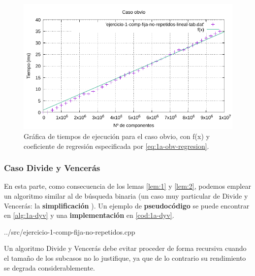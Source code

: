 \begin{figure}[h]
	\centering
	\includegraphics[scale=0.76]{img/e1a-obv}
	\caption{Gráfica de tiempos de ejecución para el caso obvio, 
		con f(x) y coeficiente de regresión especificada por \ref{eq:1a-obv-regresion}.}
	\label{fig:1a-obv-graph}
\end{figure}

\newpage

\subsubsection{Caso Divide y Vencerás} \label{sec:1a-dyv}

En esta parte, como consecuencia de los lemas \ref{lem:1} y \ref{lem:2}, podemos emplear un 
algoritmo similar al de búsqueda binaria (un caso muy particular de Divide y Vencerás: la
\textbf{simplificación} \cite{Verdegay2017}). Un ejemplo de \textbf{pseudocódigo} se puede encontrar en \ref{alg:1a-dyv} y
una \textbf{implementación} en \ref{cod:1a-dyv}.






{../src/ejercicio-1-comp-fija-no-repetidos.cpp} 


Un algoritmo Divide y Vencerás debe evitar proceder de forma recursiva cuando el tamaño de los subcasos no lo justifique, ya que
de lo contrario su rendimiento se degrada considerablemente. 

